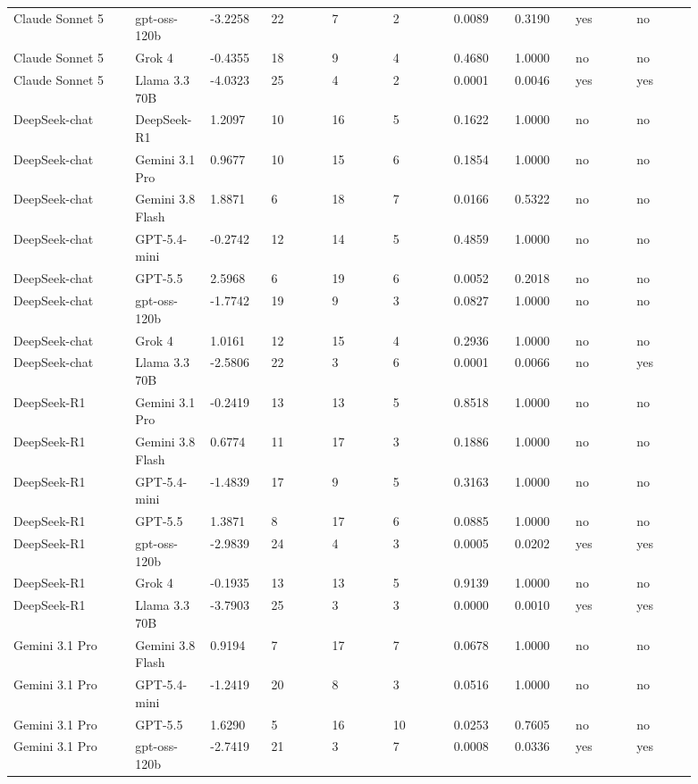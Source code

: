 \begin{landscape}
\begin{longtable}{p{0.162\linewidth}p{0.081\linewidth}p{0.081\linewidth}p{0.081\linewidth}p{0.081\linewidth}p{0.081\linewidth}p{0.081\linewidth}p{0.081\linewidth}p{0.081\linewidth}p{0.081\linewidth}}
Claude Sonnet 5 & gpt-oss-120b & -3.2258 & 22 & 7 & 2 & 0.0089 & 0.3190 & yes & no \\
Claude Sonnet 5 & Grok 4 & -0.4355 & 18 & 9 & 4 & 0.4680 & 1.0000 & no & no \\
Claude Sonnet 5 & Llama 3.3 70B & -4.0323 & 25 & 4 & 2 & 0.0001 & 0.0046 & yes & yes \\
DeepSeek-chat & DeepSeek-R1 & 1.2097 & 10 & 16 & 5 & 0.1622 & 1.0000 & no & no \\
DeepSeek-chat & Gemini 3.1 Pro & 0.9677 & 10 & 15 & 6 & 0.1854 & 1.0000 & no & no \\
DeepSeek-chat & Gemini 3.8 Flash & 1.8871 & 6 & 18 & 7 & 0.0166 & 0.5322 & no & no \\
DeepSeek-chat & GPT-5.4-mini & -0.2742 & 12 & 14 & 5 & 0.4859 & 1.0000 & no & no \\
DeepSeek-chat & GPT-5.5 & 2.5968 & 6 & 19 & 6 & 0.0052 & 0.2018 & no & no \\
DeepSeek-chat & gpt-oss-120b & -1.7742 & 19 & 9 & 3 & 0.0827 & 1.0000 & no & no \\
DeepSeek-chat & Grok 4 & 1.0161 & 12 & 15 & 4 & 0.2936 & 1.0000 & no & no \\
DeepSeek-chat & Llama 3.3 70B & -2.5806 & 22 & 3 & 6 & 0.0001 & 0.0066 & no & yes \\
DeepSeek-R1 & Gemini 3.1 Pro & -0.2419 & 13 & 13 & 5 & 0.8518 & 1.0000 & no & no \\
DeepSeek-R1 & Gemini 3.8 Flash & 0.6774 & 11 & 17 & 3 & 0.1886 & 1.0000 & no & no \\
DeepSeek-R1 & GPT-5.4-mini & -1.4839 & 17 & 9 & 5 & 0.3163 & 1.0000 & no & no \\
DeepSeek-R1 & GPT-5.5 & 1.3871 & 8 & 17 & 6 & 0.0885 & 1.0000 & no & no \\
DeepSeek-R1 & gpt-oss-120b & -2.9839 & 24 & 4 & 3 & 0.0005 & 0.0202 & yes & yes \\
DeepSeek-R1 & Grok 4 & -0.1935 & 13 & 13 & 5 & 0.9139 & 1.0000 & no & no \\
DeepSeek-R1 & Llama 3.3 70B & -3.7903 & 25 & 3 & 3 & 0.0000 & 0.0010 & yes & yes \\
Gemini 3.1 Pro & Gemini 3.8 Flash & 0.9194 & 7 & 17 & 7 & 0.0678 & 1.0000 & no & no \\
Gemini 3.1 Pro & GPT-5.4-mini & -1.2419 & 20 & 8 & 3 & 0.0516 & 1.0000 & no & no \\
Gemini 3.1 Pro & GPT-5.5 & 1.6290 & 5 & 16 & 10 & 0.0253 & 0.7605 & no & no \\
Gemini 3.1 Pro & gpt-oss-120b & -2.7419 & 21 & 3 & 7 & 0.0008 & 0.0336 & yes & yes \\

\end{longtable}
\end{landscape}

